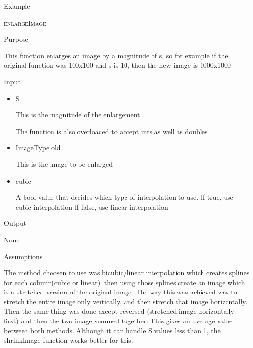 \documentclass[pdftex, 11pt]{article}
\begin{document}
\begin{description}
\begin{description}
			\item{Example}


		\end{description}


	\item{\textsc{enlargeImage}}
		\begin{description}
			\item{Purpose}
				
				This function enlarges an image by a 
				magnitude of s, so for example if the
				original function was 100x100 and s is 
				10, then the new image is 1000x1000

			\item{Input}

				\begin{itemize}

					\item{S}

						This is the magnitude of the enlargement

						The function is also overloaded 
						to accept ints as well as doubles

					\item{ImageType old}

						This is the image to be enlarged

					\item{cubic}

						A bool value that decides which type of
						interpolation to use.
						If true, use cubic interpolation
						If false, use linear interpolation
				\end{itemize}

			\item{Output}

				None

			\item{Assumptions}


				The method choosen to use was bicubic/linear
				interpolation which creates
				splines for each column(cubic or linear),
				then using those splines create an
				image which is a stretched version of the original 
				image.  The way this was achieved
				was to stretch the entire image only vertically,
				and then stretch that
				image horizontally.  Then the same thing was done except
				reversed (stretched image
				horizontally first) and then the two image summed 
				together.  This gives an
				average value between both methods.  Although it can
				handle S values less
				than 1, the shrinkImage function works better for this.


\end{description}
\end{description}
\end{document}
